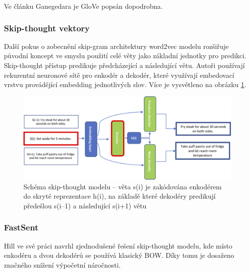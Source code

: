 \documentclass[thesis=M,czech]{FITthesis}[2019/12/23]
\begin{document}
Ve článku Ganegedara\cite{genegedara2019} je GloVe popsán dopodrobna.

\subsubsection{Skip-thought vektory}
Další pokus o zobecnění skip-gram architektury word2vec modelu rozšiřuje původní koncept ve smyslu použití celé věty jako základní jednotky pro predikci. Skip-thought přístup predikuje předcházející a následující větu. Autoři používají rekurentní neuronové sítě pro enkodér a dekodér, které využívají embedovací vrstvu provádějící embedding jednotlivých slov. Více je vysvětleno na obrázku \ref{fig:palachy2019ST}.
\begin{figure}\centering
	\includegraphics[width=\textwidth]{images/palachy2019/palachy2019_skip-thought.png}
	\caption[Schéma skip-thought modelu]{Schéma skip-thought modelu -- věta s(i) je zakódována enkodérem do skryté reprezentace h(i), na základě které dekodéry predikují předešlou s(i--1) a následující s(i+1) větu\cite{palachy2019}}
	\label{fig:palachy2019ST}
\end{figure}

\subsubsection{FastSent}
Hill ve své práci\cite{hill2016} navrhl zjednodušené řešení skip-thought modelu, kde místo enkodéru a dvou dekodérů se používá klasický BOW. Díky tomu je dosaženo značného snížení výpočetní náročnosti.
\end{document}
